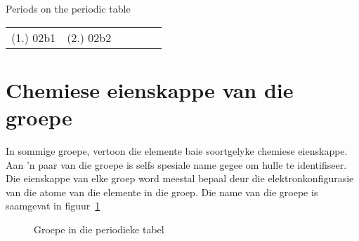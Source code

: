 \begin{exercises}{Periods on the periodic table}
{\begin{enumerate}[noitemsep, label=\textbf{\arabic*}. ]
\begin{enumerate}[noitemsep, label=\textbf{\alph*}. ]
\end{enumerate}
\end{enumerate}

\par \practiceinfo
\par \begin{tabular}[h]{cccccc}
(1.)	02b1	&
(2.)	02b2	&
\end{tabular}
}
\end{exercises}


\section{Chemiese eienskappe van die groepe}
 \label{m38760*secfhsst!!!underscore!!!id1062}
            \nopagebreak
            \label{m38760*id261554} In sommige groepe, vertoon die elemente baie soortgelyke chemiese eienskappe. Aan 'n paar van die groepe is selfs spesiale name gegee om hulle te identifiseer. Die eienskappe van elke groep word meestal bepaal deur die elektronkonfigurasie van die atome van die elemente in die groep. Die name van die groepe is saamgevat in figuur~\ref{fig:atom:periodic}\par
\begin{figure}[H]

\begin{center}
\end{center}

\caption{Groepe in die periodieke tabel}
\label{fig:atom:periodic}
\end{figure}  
